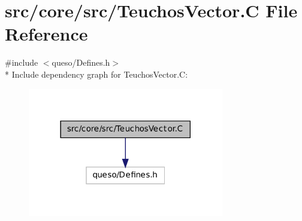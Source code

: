 \hypertarget{_teuchos_vector_8_c}{\section{src/core/src/\-Teuchos\-Vector.C File Reference}
\label{_teuchos_vector_8_c}
}
{\ttfamily \#include $<$queso/\-Defines.\-h$>$}\\*
Include dependency graph for Teuchos\-Vector.\-C\-:
\nopagebreak
\begin{figure}[H]
\begin{center}
\leavevmode
\includegraphics[width=242pt]{_teuchos_vector_8_c__incl}
\end{center}
\end{figure}
